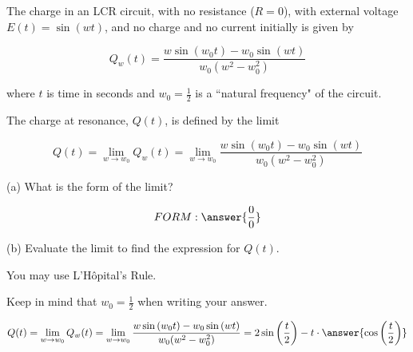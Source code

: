 \documentclass{ximera}
\author{Nela Lakos}
\begin{document}
\begin{exercise}
The charge in an LCR circuit, with no resistance ($R=0$), with external voltage $E(t)=\sin{(w t)}$, 
and no charge and no current initially is given by

\[
Q_{w}(t)=\frac{w\sin{(w_{0} t)-w_{0}\sin{(w t)}}}{w_{0}(w^2-w_{0}^2)}
\]

where $t$ is time in seconds and $w_{0}=\frac{1}{2}$ is a ``natural frequency" of the circuit.

The charge at resonance, $Q(t)$, is defined by the limit

\[
Q(t)=\lim_{w\to w_{0}} Q_{w}(t)=\lim_{w\to w_{0}} \frac{w\sin{(w_{0} t)-w_{0}\sin{(w t)}}}{w_{0}(w^2-w_{0}^2)}
\]

(a) What is the form of the limit?

\[
FORM:\answer{\frac{0}{0}}
\]

(b)  Evaluate the limit to find the expression for $Q(t)$. 

You may use L’Hôpital’s Rule.


Keep in mind that $w_{0}=\frac{1}{2}$ when writing your answer. 

\[
Q(t)=\lim_{w\to w_{0}} Q_{w}(t)=\lim_{w\to w_{0}} \frac{w\sin{(w_{0} t)-w_{0}\sin{(w t)}}}{w_{0}(w^2-w_{0}^2)}=2\sin{\left(\frac{ t}{2}\right)-t\cdot\answer{\cos{\left(\frac{t}{2}\right)}}}
\]



\end{exercise}
\end{document}
